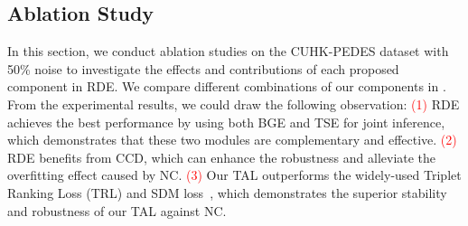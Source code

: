 \documentclass[10pt,twocolumn,letterpaper]{article}
\begin{document}
\subsection{Ablation Study}
In this section, we conduct ablation studies on the CUHK-PEDES dataset with 50\% noise to investigate the effects and contributions of each proposed component in RDE. We compare different combinations of our components in . From the experimental results, we could draw the following observation: \textcolor{red}{{(1)}} RDE achieves the best performance by using both BGE and TSE for joint inference, which demonstrates that these two modules are complementary and effective. \textcolor{red}{{(2)}} RDE benefits from CCD, which can enhance the robustness and alleviate the overfitting effect caused by NC. \textcolor{red}{{(3)}} Our TAL outperforms the widely-used Triplet Ranking Loss (TRL) and SDM loss~\cite{jiang2023cross}, which demonstrates the superior stability and robustness of our TAL against NC. 
\end{document}
